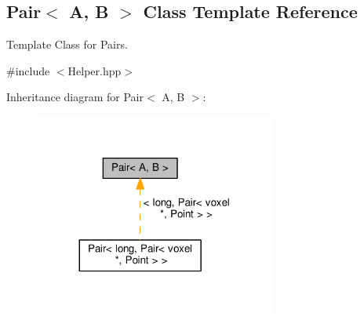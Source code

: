 \hypertarget{classPair}{}\subsection{Pair$<$ A, B $>$ Class Template Reference}
\label{classPair}


Template Class for Pairs.  




{\ttfamily \#include $<$Helper.\+hpp$>$}



Inheritance diagram for Pair$<$ A, B $>$\+:\nopagebreak
\begin{figure}[H]
\begin{center}
\leavevmode
\includegraphics[width=224pt]{classPair__inherit__graph}
\end{center}
\end{figure}
